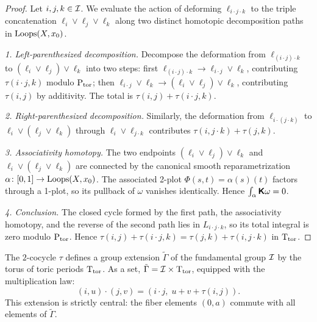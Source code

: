 \documentclass[11pt,reqno,letterpaper,twoside]{amsart}
\begin{document}
  \begin{proof}
    Let $i, j, k \in \mathcal{I}$.
    We evaluate the action of deforming $\ell_{i \cdot j \cdot k}$ to the triple concatenation $\ell_i \vee \ell_j \vee \ell_k$ along two distinct homotopic decomposition paths in $\operatorname{Loops}(X, x_0)$.
    
    \medskip
    \noindent\textit{1. Left-parenthesized decomposition.}
    Decompose the deformation from $\ell_{(i \cdot j) \cdot k}$ to $(\ell_i \vee \ell_j) \vee \ell_k$ into two steps:
    first $\ell_{(i \cdot j) \cdot k} \to \ell_{i \cdot j} \vee \ell_k$,
    contributing $\tau(i \cdot j, k)$ modulo $\operatorname{P}_{\mathrm{tor}}$;
    then $\ell_{i \cdot j} \vee \ell_k \to (\ell_i \vee \ell_j) \vee \ell_k$,
    contributing $\tau(i,j)$ by additivity.
    The total is $\tau(i,j) + \tau(i \cdot j, k)$.
    
    \medskip
    \noindent\textit{2. Right-parenthesized decomposition.}
    Similarly, the deformation from $\ell_{i \cdot (j \cdot k)}$ to $\ell_i \vee (\ell_j \vee \ell_k)$ through $\ell_i \vee \ell_{j \cdot k}$ contributes $\tau(i, j \cdot k) + \tau(j,k)$.
    
    \medskip
    \noindent\textit{3. Associativity homotopy.}
    The two endpoints $(\ell_i \vee \ell_j) \vee \ell_k$ and $\ell_i \vee (\ell_j \vee \ell_k)$ are connected by the canonical smooth reparametrization $\alpha \colon [0,1] \to \operatorname{Loops}(X, x_0)$.
    The associated 2-plot $\Phi(s,t) = \alpha(s)(t)$ factors through a 1-plot,
    so its pullback of $\omega$ vanishes identically.
    Hence $\int_\alpha \boldsymbol{\mathsf{K}}\omega = 0$.
    
    \medskip
    \noindent\textit{4. Conclusion.}
    The closed cycle formed by the first path,
    the associativity homotopy,
    and the reverse of the second path lies in $L_{i \cdot j \cdot k}$,
    so its total integral is zero modulo $\operatorname{P}_{\mathrm{tor}}$.
    Hence $\tau(i,j) + \tau(i \cdot j, k) = \tau(j,k) + \tau(i, j \cdot k)$ in $\mathrm{T}_{\mathrm{tor}}$.
  \end{proof}
  
  \begin{article}
    \label{art:The Central Extension}
    
    The $2$-cocycle $\tau$ defines a group extension $\tilde{\Gamma}$ of the fundamental group $\mathcal{I}$ by the torus of toric periods $\mathrm{T}_{\mathrm{tor}}$.
    As a set,
    $\tilde{\Gamma} = \mathcal{I} \times \mathrm{T}_{\mathrm{tor}}$,
    equipped with the multiplication law:
    \[
      (i, u) \cdot (j, v) = (i \cdot j, \; u + v + \tau(i,j)).
      \]
    This extension is strictly central:
    the fiber elements $(0, a)$ commute with all elements of $\tilde{\Gamma}$.
  \end{article}
  
\end{document}
